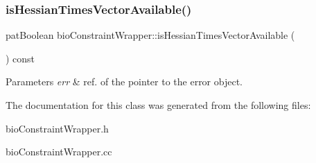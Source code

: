 \subsubsection{\texorpdfstring{is\+Hessian\+Times\+Vector\+Available()}{isHessianTimesVectorAvailable()}}
{\footnotesize\ttfamily pat\+Boolean bio\+Constraint\+Wrapper\+::is\+Hessian\+Times\+Vector\+Available (\begin{DoxyParamCaption}{ }\end{DoxyParamCaption}) const}


\begin{DoxyParams}{Parameters}
{\em err} & ref. of the pointer to the error object. \\
\hline
\end{DoxyParams}


The documentation for this class was generated from the following files\+:\begin{DoxyCompactItemize}
\item 
bio\+Constraint\+Wrapper.\+h\item 
bio\+Constraint\+Wrapper.\+cc\end{DoxyCompactItemize}
